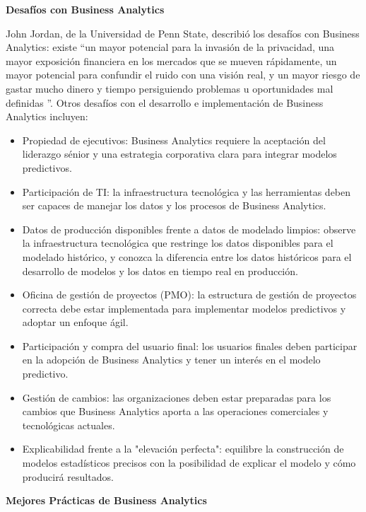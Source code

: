 \textbf{Desafíos con Business Analytics}\newline

John Jordan, de la Universidad de Penn State, describió los desafíos con Business Analytics: existe “un mayor potencial para la invasión de la privacidad, una mayor exposición financiera en los mercados que se mueven rápidamente, un mayor potencial para confundir el ruido con una visión real, y un mayor riesgo de gastar mucho dinero y tiempo persiguiendo problemas u oportunidades mal definidas ”. Otros desafíos con el desarrollo e implementación de Business Analytics incluyen:\newline

\begin{itemize}
\item Propiedad de ejecutivos: Business Analytics requiere la aceptación del liderazgo sénior y una estrategia corporativa clara para integrar modelos predictivos.
\item Participación de TI: la infraestructura tecnológica y las herramientas deben ser capaces de manejar los datos y los procesos de Business Analytics.
\item Datos de producción disponibles frente a datos de modelado limpios: observe la infraestructura tecnológica que restringe los datos disponibles para el modelado histórico, y conozca la diferencia entre los datos históricos para el desarrollo de modelos y los datos en tiempo real en producción.
\item Oficina de gestión de proyectos (PMO): la estructura de gestión de proyectos correcta debe estar implementada para implementar modelos predictivos y adoptar un enfoque ágil.
\item Participación y compra del usuario final: los usuarios finales deben participar en la adopción de Business Analytics y tener un interés en el modelo predictivo.
\item Gestión de cambios: las organizaciones deben estar preparadas para los cambios que Business Analytics aporta a las operaciones comerciales y tecnológicas actuales.
\item Explicabilidad frente a la "elevación perfecta": equilibre la construcción de modelos estadísticos precisos con la posibilidad de explicar el modelo y cómo producirá resultados.\newline
\end{itemize}

\textbf{Mejores Prácticas de Business Analytics}\newline

